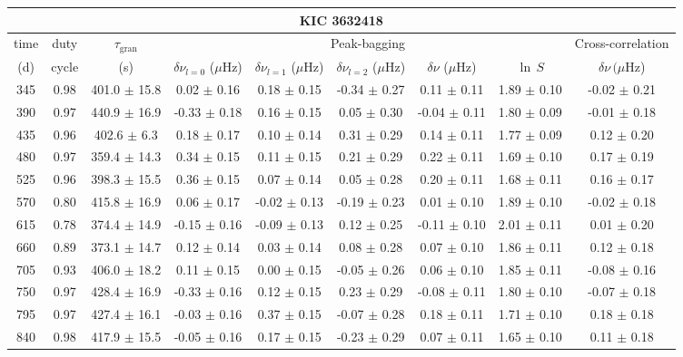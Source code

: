 \documentclass[twocolumn]{aastex61}%
\begin{document}
\begin{table*}[ht]\centering\fontsize{9.}{7.}\selectfont
\begin{tabular}{ccc|ccccc|c}
\multicolumn{9}{c}{KIC 3632418}\\ \hline\hline
time & duty & $\tau_\text{gran}$ &\multicolumn{5}{c|}{Peak-bagging}&Cross-correlation\\
(d)& cycle & (s)&$\delta\nu_{l=0}$ ($\mu$Hz) & $\delta\nu_{l=1}$ ($\mu$Hz) & $\delta\nu_{l=2}$ ($\mu$Hz) & $\delta\nu$ ($\mu$Hz)& $\ln\,S$ & $\delta\nu\,(\mu$Hz)\\\hline
345 & 0.98 & 401.0 $\pm$ 15.8 & 0.02 $\pm$ 0.16 & 0.18 $\pm$ 0.15 & -0.34 $\pm$ 0.27 & 0.11 $\pm$ 0.11 & 1.89 $\pm$ 0.10 & -0.02 $\pm$ 0.21\\
390 & 0.97 & 440.9 $\pm$ 16.9 & -0.33 $\pm$ 0.18 & 0.16 $\pm$ 0.15 & 0.05 $\pm$ 0.30 & -0.04 $\pm$ 0.11 & 1.80 $\pm$ 0.09 & -0.01 $\pm$ 0.18\\
435 & 0.96 & 402.6 $\pm$ 6.3 & 0.18 $\pm$ 0.17 & 0.10 $\pm$ 0.14 & 0.31 $\pm$ 0.29 & 0.14 $\pm$ 0.11 & 1.77 $\pm$ 0.09 & 0.12 $\pm$ 0.20\\
480 & 0.97 & 359.4 $\pm$ 14.3 & 0.34 $\pm$ 0.15 & 0.11 $\pm$ 0.15 & 0.21 $\pm$ 0.29 & 0.22 $\pm$ 0.11 & 1.69 $\pm$ 0.10 & 0.17 $\pm$ 0.19\\
525 & 0.96 & 398.3 $\pm$ 15.5 & 0.36 $\pm$ 0.15 & 0.07 $\pm$ 0.14 & 0.05 $\pm$ 0.28 & 0.20 $\pm$ 0.11 & 1.68 $\pm$ 0.11 & 0.16 $\pm$ 0.17\\
570 & 0.80 & 415.8 $\pm$ 16.9 & 0.06 $\pm$ 0.17 & -0.02 $\pm$ 0.13 & -0.19 $\pm$ 0.23 & 0.01 $\pm$ 0.10 & 1.89 $\pm$ 0.10 & -0.02 $\pm$ 0.18\\
615 & 0.78 & 374.4 $\pm$ 14.9 & -0.15 $\pm$ 0.16 & -0.09 $\pm$ 0.13 & 0.12 $\pm$ 0.25 & -0.11 $\pm$ 0.10 & 2.01 $\pm$ 0.11 & 0.01 $\pm$ 0.20\\
660 & 0.89 & 373.1 $\pm$ 14.7 & 0.12 $\pm$ 0.14 & 0.03 $\pm$ 0.14 & 0.08 $\pm$ 0.28 & 0.07 $\pm$ 0.10 & 1.86 $\pm$ 0.11 & 0.12 $\pm$ 0.18\\
705 & 0.93 & 406.0 $\pm$ 18.2 & 0.11 $\pm$ 0.15 & 0.00 $\pm$ 0.15 & -0.05 $\pm$ 0.26 & 0.06 $\pm$ 0.10 & 1.85 $\pm$ 0.11 & -0.08 $\pm$ 0.16\\
750 & 0.97 & 428.4 $\pm$ 16.9 & -0.33 $\pm$ 0.16 & 0.12 $\pm$ 0.15 & 0.23 $\pm$ 0.29 & -0.08 $\pm$ 0.11 & 1.80 $\pm$ 0.10 & -0.07 $\pm$ 0.18\\
795 & 0.97 & 427.4 $\pm$ 16.1 & -0.03 $\pm$ 0.16 & 0.37 $\pm$ 0.15 & -0.07 $\pm$ 0.28 & 0.18 $\pm$ 0.11 & 1.71 $\pm$ 0.10 & 0.18 $\pm$ 0.18\\
840 & 0.98 & 417.9 $\pm$ 15.5 & -0.05 $\pm$ 0.16 & 0.17 $\pm$ 0.15 & -0.23 $\pm$ 0.29 & 0.07 $\pm$ 0.11 & 1.65 $\pm$ 0.10 & 0.11 $\pm$ 0.18\\

\end{tabular}
\end{table*}
\end{document}
